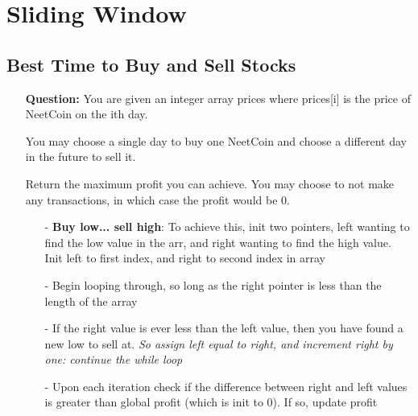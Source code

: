 \documentclass[12pt]{article}
\begin{document}
\section{Sliding Window}
\subsection{Best Time to Buy and Sell Stocks}
\begin{enumerate}
  \item[] \textbf{Question:} You are given an integer array prices where prices[i] is the price of NeetCoin on the ith day.

You may choose a single day to buy one NeetCoin and choose a different day in the future to sell it.

Return the maximum profit you can achieve. You may choose to not make any transactions, in which case the profit would be 0.
    \begin{enumerate}
      \item[-] \textbf{Buy low... sell high}: To achieve this, init two pointers, left wanting to find the low value in the arr, and right wanting to find the high value. Init left to first index, and right to second index in array
      \item[-] Begin looping through, so long as the right pointer is less than the length of the array
      \item[-] If the right value is ever less than the left value, then you have found a new low to sell at. \textit{So assign left equal to right, and increment right by one: continue the while loop}
      \item[-] Upon each iteration check if the difference between right and left values is greater than global profit (which is init to 0). If so, update profit 
    \end{enumerate}
\end{enumerate}
\end{document}
